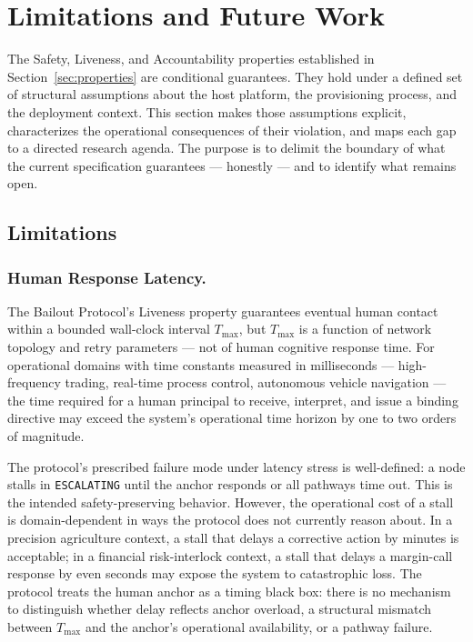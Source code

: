 \section{Limitations and Future Work}
\label{sec:limitations}

The Safety, Liveness, and Accountability properties established in Section~\ref{sec:properties} are conditional guarantees. They hold under a defined set of structural assumptions about the host platform, the provisioning process, and the deployment context. This section makes those assumptions explicit, characterizes the operational consequences of their violation, and maps each gap to a directed research agenda. The purpose is to delimit the boundary of what the current specification guarantees — honestly — and to identify what remains open.

\subsection{Limitations}

\subsubsection{Human Response Latency.}
The Bailout Protocol's Liveness property guarantees eventual human contact within a bounded wall-clock interval $T_{\max}$, but $T_{\max}$ is a function of network topology and retry parameters — not of human cognitive response time. For operational domains with time constants measured in milliseconds — high-frequency trading, real-time process control, autonomous vehicle navigation — the time required for a human principal to receive, interpret, and issue a binding directive may exceed the system's operational time horizon by one to two orders of magnitude.

The protocol's prescribed failure mode under latency stress is well-defined: a node stalls in \texttt{ESCALATING} until the anchor responds or all pathways time out. This is the intended safety-preserving behavior. However, the operational cost of a stall is domain-dependent in ways the protocol does not currently reason about. In a precision agriculture context, a stall that delays a corrective action by minutes is acceptable; in a financial risk-interlock context, a stall that delays a margin-call response by even seconds may expose the system to catastrophic loss. The protocol treats the human anchor as a timing black box: there is no mechanism to distinguish whether delay reflects anchor overload, a structural mismatch between $T_{\max}$ and the anchor's operational availability, or a pathway failure.

